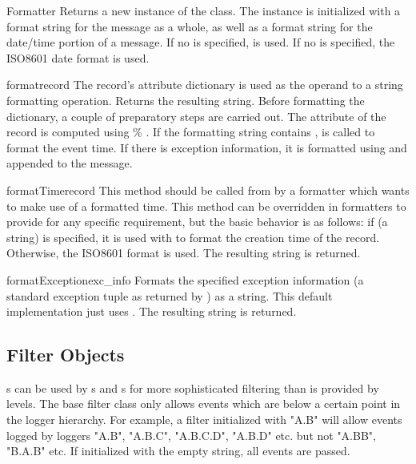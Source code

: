 \begin{classdesc}{Formatter}{}
Returns a new instance of the  class. The
instance is initialized with a format string for the message as a whole,
as well as a format string for the date/time portion of a message. If
no  is specified,  is used. If no 
is specified, the ISO8601 date format is used.
\end{classdesc}

\begin{methoddesc}{format}{record}
The record's attribute dictionary is used as the operand to a
string formatting operation. Returns the resulting string.
Before formatting the dictionary, a couple of preparatory steps
are carried out. The  attribute of the record is computed
using  \% . If the formatting string contains
,  is called to format the
event time. If there is exception information, it is formatted using
 and appended to the message.
\end{methoddesc}

\begin{methoddesc}{formatTime}{record}
This method should be called from  by a formatter which
wants to make use of a formatted time. This method can be overridden
in formatters to provide for any specific requirement, but the
basic behavior is as follows: if  (a string) is specified,
it is used with  to format the creation time of the
record. Otherwise, the ISO8601 format is used. The resulting
string is returned.
\end{methoddesc}

\begin{methoddesc}{formatException}{exc_info}
Formats the specified exception information (a standard exception tuple
as returned by ) as a string. This default
implementation just uses .
The resulting string is returned.
\end{methoddesc}

\subsection{Filter Objects}

s can be used by s and s for
more sophisticated filtering than is provided by levels. The base filter
class only allows events which are below a certain point in the logger
hierarchy. For example, a filter initialized with "A.B" will allow events
logged by loggers "A.B", "A.B.C", "A.B.C.D", "A.B.D" etc. but not "A.BB",
"B.A.B" etc. If initialized with the empty string, all events are passed.

